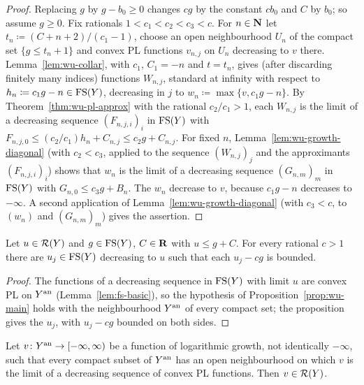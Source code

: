 \begin{proof}
Replacing $g$ by $g-b_0\ge0$ changes $cg$ by the constant $cb_0$ and $C$ by $b_0$; so assume $g\ge0$. Fix rationals
$1<c_1<c_2<c_3<c$. For $n\in\mathbf{N}$ let $t_n\coloneqq(C+n+2)/(c_1-1)$, choose an open neighbourhood $U_n$ of the
compact set $\{g\le t_n+1\}$ and convex PL functions $v_{n,j}$ on $U_n$ decreasing to $v$ there. Lemma~\ref{lem:wu-collar},
with $c_1$, $C_1=-n$ and $t=t_n$, gives (after discarding finitely many indices) functions $W_{n,j}$, standard at
infinity with respect to $h_n\coloneqq c_1g-n\in\mathrm{FS}(Y)$, decreasing in $j$ to $w_n\coloneqq\max\{v,c_1g-n\}$.
By Theorem~\ref{thm:wu-pl-approx} with the rational $c_2/c_1>1$, each $W_{n,j}$ is the limit of a decreasing
sequence $(F_{n,j,i})_i$ in $\mathrm{FS}(Y)$ with $F_{n,j,0}\le(c_2/c_1)h_n+C_{n,j}\le c_2g+C_{n,j}$. For fixed $n$,
Lemma~\ref{lem:wu-growth-diagonal} (with $c_2<c_3$, applied to the sequence $(W_{n,j})_j$ and the approximants
$(F_{n,j,i})_i$) shows that $w_n$ is the limit of a decreasing sequence $(G_{n,m})_m$ in $\mathrm{FS}(Y)$ with
$G_{n,0}\le c_3g+B_{n}$. The $w_n$ decrease to $v$, because $c_1g-n$ decreases to $-\infty$. A second application
of Lemma~\ref{lem:wu-growth-diagonal} (with $c_3<c$, to $(w_n)$ and $(G_{n,m})_m$) gives the assertion.
\end{proof}

\begin{theorem}\label{thm:wu-growth-control}
\leanok
{}
Let $u\in\mathcal{R}(Y)$ and $g\in\mathrm{FS}(Y)$, $C\in\mathbf{R}$ with $u\le g+C$. For every rational $c>1$ there are $u_j\in\mathrm{FS}(Y)$
decreasing to $u$ such that each $u_j-cg$ is bounded.
\end{theorem}

\begin{proof}
The functions of a decreasing sequence in $\mathrm{FS}(Y)$ with limit $u$ are convex PL on $Y^{\mathrm{an}}$
(Lemma~\ref{lem:fs-basic}), so the hypothesis of Proposition~\ref{prop:wu-main} holds with the neighbourhood
$Y^{\mathrm{an}}$ of every compact set; the proposition gives the $u_j$, with $u_j-cg$ bounded on both sides.
\end{proof}

\begin{theorem}\label{thm:wu-local-to-global}
\leanok
{}
Let $v\colon Y^{\mathrm{an}}\to[-\infty,\infty)$ be a function of logarithmic growth, not identically $-\infty$, such that
every compact subset of $Y^{\mathrm{an}}$ has an open neighbourhood on which $v$ is the limit of a decreasing sequence of
convex PL functions. Then $v\in\mathcal{R}(Y)$.
\end{theorem}

